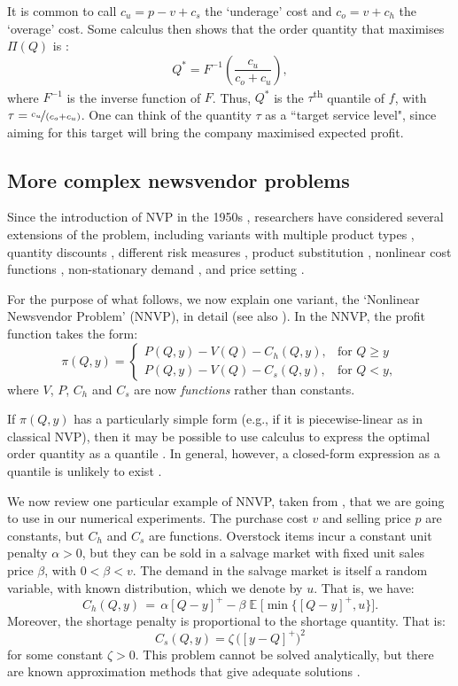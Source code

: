 \documentclass[a4paper,11pt]{article}
\DeclareMathOperator{\E}{\mathbb{E}}
\begin{document}
It is common to call $c_u= p-v+c_s$ the ‘underage’ cost and $c_o = v+c_h$ the ‘overage’ cost. Some calculus then shows that the order quantity that maximises $\Pi(Q)$ is \cite{Ch12}:
\[
    Q^* = F^{-1}\left( \frac{c_u}{c_o+c_u} \right),
\]
where $F^{-1}$ is the inverse function of $F$. Thus, $Q^*$ is the $\tau$\textsuperscript{th} quantile of $f$, with $\tau=\nicefrac{c_u}{(c_o+c_u)}$. One can think of the quantity
$\tau$ as a ``target service level", since aiming for this target will bring the company maximised expected profit.

\subsection{More complex newsvendor problems} %

Since the introduction of NVP in the 1950s \cite{AHM51,MK51}, researchers have considered several extensions of the problem, including variants with multiple product types \cite{HW63,LL96,MS00}, quantity discounts \cite{Kh95}, different risk measures \cite{EGS95}, product substitution \cite{BAA99}, nonlinear cost functions \cite{HOS12}, non-stationary demand \cite{KWH15}, and price setting \cite{KC62,Mi59,PD99}.

For the purpose of what follows, we now explain one variant, the `Nonlinear Newsvendor Problem' (NNVP), in detail (see also \cite{BT06,HOS12,HN16,KC62,Kh95,KK18,Mi59,PSC15,PD99,Po90,Po02}). In the NNVP, the profit function takes the form:
\[
    \pi(Q,y)=
    \begin{cases}
        P(Q,y)-V(Q)-C_h(Q,y),& \text{for } Q \geq y\\
        P(Q,y)-V(Q)-C_s(Q,y),& \text{for } Q< y,
    \end{cases}
\]
where $V$, $P$, $C_h$ and $C_s$ are now \emph{functions} rather than constants.

If $\pi(Q,y)$ has a particularly simple form (e.g., if it is piecewise-linear as in classical NVP), then it may be possible to  use calculus to express the optimal order quantity as a quantile \cite{Ch12}. In general, however, a closed-form expression as a quantile is unlikely to exist \cite{HOS12,Po02}.

We now review one particular example of NNVP, taken from \cite{KK18,PD99,Ro02}, that we are going to use in our numerical experiments. The purchase cost $v$ and selling price $p$ are constants, but $C_h$ and $C_s$ are functions. Overstock items incur a constant unit penalty $\alpha > 0$, but they can be sold in a salvage market with fixed unit sales price $\beta$, with $0<\beta<v$. The demand in the salvage market is itself a random variable, with known distribution, which we denote by $u$. That is, we have:
\[
    C_h(Q,y) \, = \, \alpha[Q-y]^{+} - \beta \E \Big[ \min \big\{ [Q-y]^{+},u \big\} \Big].
\]
Moreover, the shortage penalty is proportional to the shortage quantity. That is:
\[
C_s(Q,y) =  \zeta \, \big( [y-Q]^{+} \big)^2
\]
for some constant $\zeta > 0$. This problem cannot be solved analytically, but there are known approximation methods that give adequate solutions \cite{KK18}.
\end{document}
